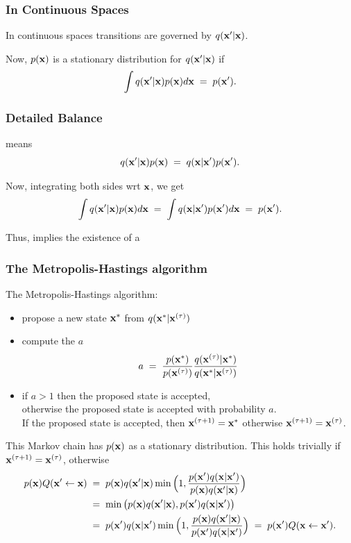 \begin{frame}
\frametitle{In Continuous Spaces}

In continuous spaces transitions are governed by $q(\mathbf x'|\mathbf x)$.

Now, $p(\mathbf x)$ is a stationary distribution for $q(\mathbf x'|\mathbf x)$ if
\[
\int q(\mathbf x'|\mathbf x)p(\mathbf x)d\mathbf x\;=\;p(\mathbf x').
\]
\end{frame}


\begin{frame}
\frametitle{Detailed Balance}

 means
\[
q(\mathbf x'|\mathbf x)p(\mathbf x)\;=\;q(\mathbf x|\mathbf x')p(\mathbf x').
\]

Now, integrating both sides wrt $\mathbf x$, we get
\[
\int q(\mathbf x'|\mathbf x)p(\mathbf x)d\mathbf x\;=\;\int q(\mathbf x|\mathbf x')p(\mathbf x')d\mathbf x\;=\;p(\mathbf x').
\]

Thus,  implies the existence of a
\end{frame}


\begin{frame}
\frametitle{The Metropolis-Hastings algorithm}

The Metropolis-Hastings algorithm:
\begin{itemize}
\item propose a new state $\mathbf x^*$ from $q(\mathbf x^*|\mathbf x^{(\tau)})$
\item compute the  $a$
\[
a\;=\;\frac{p(\mathbf x^*)}{p(\mathbf x^{(\tau)})}
\frac{q(\mathbf x^{(\tau)}|\mathbf x^*)}{q(\mathbf x^*|\mathbf x^{(\tau)})}
\]
\item if $a>1$ then the proposed state is accepted,\\
otherwise the proposed state is accepted with probability $a$.\\
If the proposed state is accepted,
  then $\mathbf x^{(\tau+1)}=\mathbf x^*$ otherwise $\mathbf x^{(\tau+1)}=\mathbf x^{(\tau)}$.
\end{itemize}
This Markov chain has $p(\mathbf x)$ as a stationary distribution. This
holds trivially if $\mathbf x^{(\tau+1)}=\mathbf x^{(\tau)}$, otherwise
\[
\begin{split}
p(\mathbf x)Q(\mathbf x'\leftarrow\mathbf x)\;&=\;p(\mathbf x)q(\mathbf x'|\mathbf x)\min\Big(1,\frac{p(\mathbf x')q(\mathbf x|\mathbf x')}{p(\mathbf x)q(\mathbf x'|\mathbf x)}\Big)\\
&=\;\min\big(p(\mathbf x)q(\mathbf x'|\mathbf x),p(\mathbf x')q(\mathbf x|\mathbf x')\big)\\
&=\;p(\mathbf x')q(\mathbf x|\mathbf x')\min\Big(1,\frac{p(\mathbf x)q(\mathbf x'|\mathbf x)}{p(\mathbf x')q(\mathbf x|\mathbf x')}\Big)\;=\;p(\mathbf x')Q(\mathbf x\leftarrow\mathbf x').
\end{split}
\]
\end{frame}

